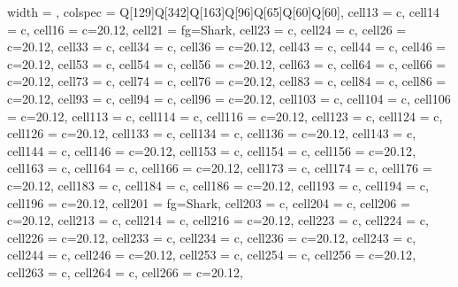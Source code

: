 \documentclass{article}
\newcommand\Fontvi{\fontsize{8}{8}\selectfont}
\begin{document}
{\Fontvi
\begin{longtblr}[
  caption = {Categorical survey responses for confirmed time series (6 responses), wastewater (5 responses), deaths (XX responses), and transmission pairs (XX responses).},
 label = {tab:survey_results},
  entry = none,
]{
  width = \linewidth,
  colspec = {Q[129]Q[342]Q[163]Q[96]Q[65]Q[60]Q[60]},
  cell{1}{3} = {c},
  cell{1}{4} = {c},
  cell{1}{6} = {c=2}{0.12\linewidth},
  cell{2}{1} = {fg=Shark},
  cell{2}{3} = {c},
  cell{2}{4} = {c},
  cell{2}{6} = {c=2}{0.12\linewidth},
  cell{3}{3} = {c},
  cell{3}{4} = {c},
  cell{3}{6} = {c=2}{0.12\linewidth},
  cell{4}{3} = {c},
  cell{4}{4} = {c},
  cell{4}{6} = {c=2}{0.12\linewidth},
  cell{5}{3} = {c},
  cell{5}{4} = {c},
  cell{5}{6} = {c=2}{0.12\linewidth},
  cell{6}{3} = {c},
  cell{6}{4} = {c},
  cell{6}{6} = {c=2}{0.12\linewidth},
  cell{7}{3} = {c},
  cell{7}{4} = {c},
  cell{7}{6} = {c=2}{0.12\linewidth},
  cell{8}{3} = {c},
  cell{8}{4} = {c},
  cell{8}{6} = {c=2}{0.12\linewidth},
  cell{9}{3} = {c},
  cell{9}{4} = {c},
  cell{9}{6} = {c=2}{0.12\linewidth},
  cell{10}{3} = {c},
  cell{10}{4} = {c},
  cell{10}{6} = {c=2}{0.12\linewidth},
  cell{11}{3} = {c},
  cell{11}{4} = {c},
  cell{11}{6} = {c=2}{0.12\linewidth},
  cell{12}{3} = {c},
  cell{12}{4} = {c},
  cell{12}{6} = {c=2}{0.12\linewidth},
  cell{13}{3} = {c},
  cell{13}{4} = {c},
  cell{13}{6} = {c=2}{0.12\linewidth},
  cell{14}{3} = {c},
  cell{14}{4} = {c},
  cell{14}{6} = {c=2}{0.12\linewidth},
  cell{15}{3} = {c},
  cell{15}{4} = {c},
  cell{15}{6} = {c=2}{0.12\linewidth},
  cell{16}{3} = {c},
  cell{16}{4} = {c},
  cell{16}{6} = {c=2}{0.12\linewidth},
  cell{17}{3} = {c},
  cell{17}{4} = {c},
  cell{17}{6} = {c=2}{0.12\linewidth},
  cell{18}{3} = {c},
  cell{18}{4} = {c},
  cell{18}{6} = {c=2}{0.12\linewidth},
  cell{19}{3} = {c},
  cell{19}{4} = {c},
  cell{19}{6} = {c=2}{0.12\linewidth},
  cell{20}{1} = {fg=Shark},
  cell{20}{3} = {c},
  cell{20}{4} = {c},
  cell{20}{6} = {c=2}{0.12\linewidth},
  cell{21}{3} = {c},
  cell{21}{4} = {c},
  cell{21}{6} = {c=2}{0.12\linewidth},
  cell{22}{3} = {c},
  cell{22}{4} = {c},
  cell{22}{6} = {c=2}{0.12\linewidth},
  cell{23}{3} = {c},
  cell{23}{4} = {c},
  cell{23}{6} = {c=2}{0.12\linewidth},
  cell{24}{3} = {c},
  cell{24}{4} = {c},
  cell{24}{6} = {c=2}{0.12\linewidth},
  cell{25}{3} = {c},
  cell{25}{4} = {c},
  cell{25}{6} = {c=2}{0.12\linewidth},
  cell{26}{3} = {c},
  cell{26}{4} = {c},
  cell{26}{6} = {c=2}{0.12\linewidth},
}
\end{longtblr}}
\end{document}
